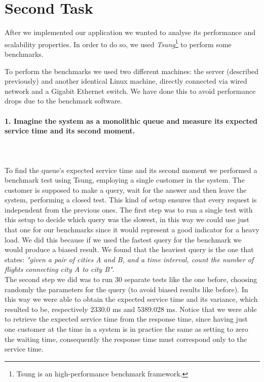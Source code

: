 \documentclass[11pt]{scrartcl} %
\begin{document}
\section{Second Task}

After we implemented our application we wanted to analyse its performance and scalability properties. In order to do so, we used \textit{Tsung}\footnote{Tsung is an high-performance benchmark framework.} to perform some benchmarks.

To perform the benchmarks we used two different machines: the server (described previously) and another identical Linux machine, directly connected via wired network and a Gigabit Ethernet switch. We have done this to avoid performance drops due to the benchmark software.




\paragraph*{1. Imagine the system as a monolithic queue and measure its expected service time and its second moment.} \mbox{}\\\\ 

To find the queue's expected service time and its second moment we performed a benchmark test using Tsung, employing a single customer in the system. The customer is supposed to make a query, wait for the answer and then leave the system, performing a closed test. This kind of setup ensures that every request is independent from the previous ones. 
The first step was to run a single test with this setup to decide which query was the slowest, in this way we could use just that one for our benchmarks since it would represent a good indicator for a heavy load.
We did this because if we used the fastest query for the benchmark we would produce a biased result. We found that the heaviest query is the one that states: \textit{"given a pair of cities A and B, and a time interval, count the number of flights connecting city A to city B"}.\\


The second step we did was to run 30 separate tests like the one before, choosing randomly the parameters for the query (to avoid biased results like before). In this way we were able to obtain the expected service time and its variance, which resulted to be, respectively 2330.0 ms and 5389.028 ms.
Notice that we were able to retrieve the expected service time from the response time, since having just one customer at the time in a system is in practice the same as setting to zero the waiting time, consequently the response time must correspond only to the service time.
\end{document}

